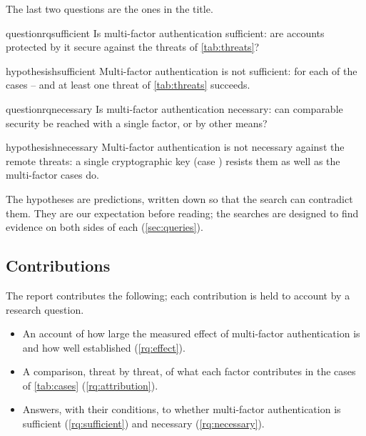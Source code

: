 The last two questions are the ones in the title.
\begin{restatable}{question}{rqsufficient}\label{rq:sufficient}
  Is multi-factor authentication sufficient: are accounts protected by
  it secure against the threats of \cref{tab:threats}?
\end{restatable}
\begin{restatable}{hypothesis}{hsufficient}\label{h:sufficient}
  Multi-factor authentication is not sufficient: for each of the cases
  -- and  at least one threat of
  \cref{tab:threats} succeeds.
\end{restatable}
\begin{restatable}{question}{rqnecessary}\label{rq:necessary}
  Is multi-factor authentication necessary: can comparable security be
  reached with a single factor, or by other means?
\end{restatable}
\begin{restatable}{hypothesis}{hnecessary}\label{h:necessary}
  Multi-factor authentication is not necessary against the remote
  threats: a single cryptographic key (case ) resists them as
  well as the multi-factor cases do.
\end{restatable}

The hypotheses are predictions, written down so that the search can
contradict them.
They are our expectation before reading; the searches are designed to
find evidence on both sides of each (\cref{sec:queries}).

\subsection{Contributions}

The report contributes the following; each contribution is held to
account by a research question.
\begin{itemize}
  \item An account of how large the measured effect of multi-factor
    authentication is and how well established (\cref{rq:effect}).
  \item A comparison, threat by threat, of what each factor contributes
    in the cases of \cref{tab:cases}
    (\cref{rq:attribution}).
  \item Answers, with their conditions, to whether multi-factor
    authentication is sufficient (\cref{rq:sufficient}) and necessary
    (\cref{rq:necessary}).
\end{itemize}


